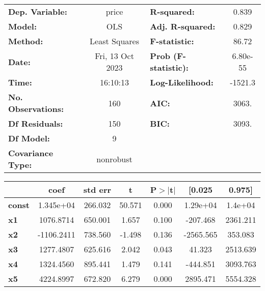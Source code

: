 \begin{center}
\begin{tabular}{lclc}
\toprule
\textbf{Dep. Variable:}    &      price       & \textbf{  R-squared:         } &     0.839   \\
\textbf{Model:}            &       OLS        & \textbf{  Adj. R-squared:    } &     0.829   \\
\textbf{Method:}           &  Least Squares   & \textbf{  F-statistic:       } &     86.72   \\
\textbf{Date:}             & Fri, 13 Oct 2023 & \textbf{  Prob (F-statistic):} &  6.80e-55   \\
\textbf{Time:}             &     16:10:13     & \textbf{  Log-Likelihood:    } &   -1521.3   \\
\textbf{No. Observations:} &         160      & \textbf{  AIC:               } &     3063.   \\
\textbf{Df Residuals:}     &         150      & \textbf{  BIC:               } &     3093.   \\
\textbf{Df Model:}         &           9      & \textbf{                     } &             \\
\textbf{Covariance Type:}  &    nonrobust     & \textbf{                     } &             \\
\bottomrule
\end{tabular}
\begin{tabular}{lcccccc}
               & \textbf{coef} & \textbf{std err} & \textbf{t} & \textbf{P$> |$t$|$} & \textbf{[0.025} & \textbf{0.975]}  \\
\midrule
\textbf{const} &    1.345e+04  &      266.032     &    50.571  &         0.000        &     1.29e+04    &      1.4e+04     \\
\textbf{x1}    &    1076.8714  &      650.001     &     1.657  &         0.100        &     -207.468    &     2361.211     \\
\textbf{x2}    &   -1106.2411  &      738.560     &    -1.498  &         0.136        &    -2565.565    &      353.083     \\
\textbf{x3}    &    1277.4807  &      625.616     &     2.042  &         0.043        &       41.323    &     2513.639     \\
\textbf{x4}    &    1324.4560  &      895.441     &     1.479  &         0.141        &     -444.851    &     3093.763     \\
\textbf{x5}    &    4224.8997  &      672.820     &     6.279  &         0.000        &     2895.471    &     5554.328     \\

\end{tabular}
\end{center}
